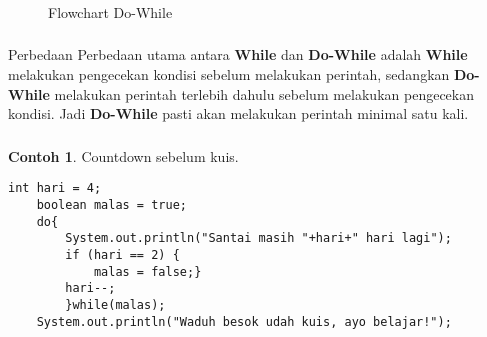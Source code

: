 \documentclass[aspectratio=169]{beamer}
\theoremstyle{definition}
\newtheorem*{contoh}{Contoh}
\begin{document}
    \begin{frame}
        \frametitle{\insertsection}
        \begin{figure}
            \centering
            \caption{Flowchart Do-While}
        \end{figure}
    \end{frame}

    \begin{frame}
        \frametitle{\insertsection}
        \begin{alertblock}{Perbedaan}
            Perbedaan utama antara \textbf{While} dan \textbf{Do-While} adalah \textbf{While} melakukan pengecekan kondisi sebelum melakukan perintah, sedangkan \textbf{Do-While} melakukan perintah terlebih dahulu sebelum melakukan pengecekan kondisi. Jadi \textbf{Do-While} pasti akan melakukan perintah minimal satu kali.
        \end{alertblock}
    \end{frame}

    \begin{frame}[fragile]
        \frametitle{\insertsection}
        \begin{contoh}
            Countdown sebelum kuis.
        \end{contoh}
        \begin{lstlisting}[firstnumber=12]
    int hari = 4;
    boolean malas = true;
    do{
        System.out.println("Santai masih "+hari+" hari lagi");
        if (hari == 2) {
            malas = false;}
        hari--;
        }while(malas);
    System.out.println("Waduh besok udah kuis, ayo belajar!");
        \end{lstlisting}
    \end{frame}
\end{document}
